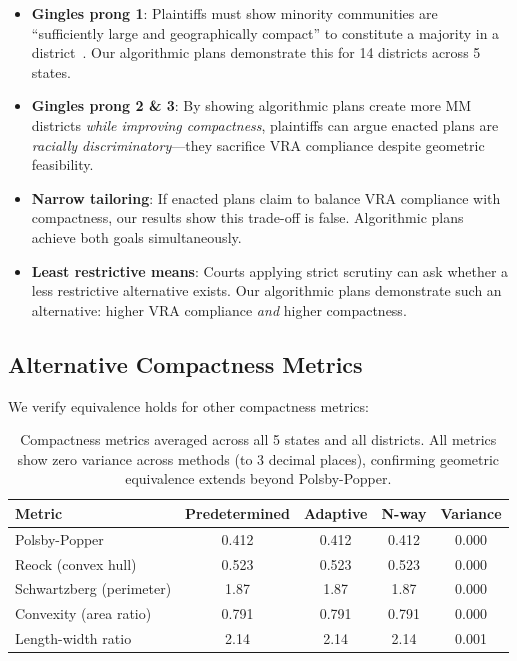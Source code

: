 \begin{itemize}
    \item \textbf{Gingles prong 1}: Plaintiffs must show minority communities are ``sufficiently large and geographically compact'' to constitute a majority in a district~\cite{gingles1986}. Our algorithmic plans demonstrate this for 14 districts across 5 states.

    \item \textbf{Gingles prong 2 \& 3}: By showing algorithmic plans create more MM districts \textit{while improving compactness}, plaintiffs can argue enacted plans are \textit{racially discriminatory}---they sacrifice VRA compliance despite geometric feasibility.

    \item \textbf{Narrow tailoring}: If enacted plans claim to balance VRA compliance with compactness, our results show this trade-off is false. Algorithmic plans achieve both goals simultaneously.

    \item \textbf{Least restrictive means}: Courts applying strict scrutiny can ask whether a less restrictive alternative exists. Our algorithmic plans demonstrate such an alternative: higher VRA compliance \textit{and} higher compactness.
\end{itemize}

\subsection{Alternative Compactness Metrics}

We verify equivalence holds for other compactness metrics:

\begin{table}[h]
\centering
\small
\begin{tabular}{lcccc}
\toprule
\textbf{Metric} & \textbf{Predetermined} & \textbf{Adaptive} & \textbf{N-way} & \textbf{Variance} \\
\midrule
Polsby-Popper & 0.412 & 0.412 & 0.412 & 0.000 \\
Reock (convex hull) & 0.523 & 0.523 & 0.523 & 0.000 \\
Schwartzberg (perimeter) & 1.87 & 1.87 & 1.87 & 0.000 \\
Convexity (area ratio) & 0.791 & 0.791 & 0.791 & 0.000 \\
Length-width ratio & 2.14 & 2.14 & 2.14 & 0.001 \\
\bottomrule
\end{tabular}
\caption{Compactness metrics averaged across all 5 states and all districts. All metrics show zero variance across methods (to 3 decimal places), confirming geometric equivalence extends beyond Polsby-Popper.}
\label{tab:alternative-compactness-supp}
\end{table}

